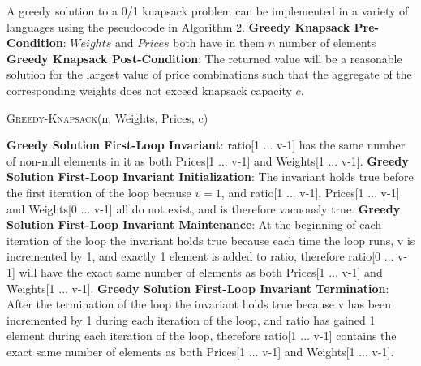 \documentclass[onecolumn, 12pt, article]{IEEEtran}
\numberwithin{case}{problem}
\numberwithin{condition}{problem}
\numberwithin{condition}{subsection}
\numberwithin{definition}{section}
\theoremstyle{remark}
\numberwithin{question}{problem}
\theoremstyle{plain}
\numberwithin{answer}{problem}
\numberwithin{solution}{section}
\numberwithin{equation}{section}%
\begin{document}
A greedy solution to a 0/1 knapsack problem can be implemented in a variety of languages using the pseudocode in Algorithm 2.
\newline
\textbf{Greedy Knapsack Pre-Condition}: $Weights$ and $Prices$ both have in them $n$ number of elements
\newline
\textbf{Greedy Knapsack Post-Condition}: The returned value will be a reasonable solution for the largest value of price combinations such that the aggregate of the corresponding weights does not exceed knapsack capacity $c$.
\begin{algorithm}
\caption {\textsc{Greedy-Knapsack}(n, Weights, Prices, c)}
\label{algo:greedy}
\begin{algorithmic}[1]
\EndIf
{}
\EndIf
{}
\EndFor
{}
	\EndIf
\EndWhile
{}
\EndProcedure
\end{algorithmic}
\end{algorithm}
\newline
\textbf{Greedy Solution First-Loop Invariant}: ratio[1 ... v-1] has the same number of non-null elements in it as both Prices[1 ... v-1] and Weights[1 ... v-1].
\newline
\textbf{Greedy Solution First-Loop Invariant Initialization}: The invariant holds true before the first iteration of the loop because $v=1$, and ratio[1 ... v-1], Prices[1 ... v-1] and Weights[0 ... v-1] all do not exist, and is therefore vacuously true.
\newline
\textbf{Greedy Solution First-Loop Invariant Maintenance}: At the beginning of each iteration of the loop the invariant holds true because each time the loop runs, v is incremented by 1, and exactly 1 element is added to ratio, therefore ratio[0 ... v-1] will have the exact same number of elements as both Prices[1 ... v-1] and Weights[1 ... v-1].
\newline
\textbf{Greedy Solution First-Loop Invariant Termination}: After the termination of the loop the invariant holds true because v has been incremented by 1 during each iteration of the loop, and ratio has gained 1 element during each iteration of the loop, therefore ratio[1 ... v-1] contains the exact same number of elements as both Prices[1 ... v-1] and Weights[1 ... v-1].
\end{document}
